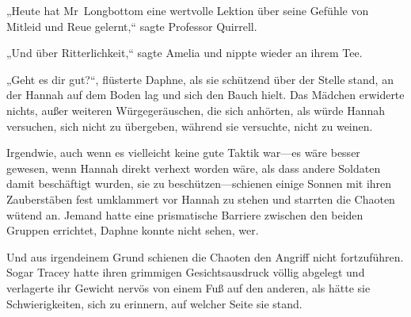 \later

„Heute hat Mr~Longbottom eine wertvolle Lektion über seine Gefühle von Mitleid und Reue gelernt,“ sagte Professor Quirrell.

„Und über Ritterlichkeit,“ sagte Amelia und nippte wieder an ihrem Tee.

\later

„Geht es dir gut?“, flüsterte Daphne, als sie schützend über der Stelle stand, an der Hannah auf dem Boden lag und sich den Bauch hielt. Das Mädchen erwiderte nichts, außer weiteren Würgegeräuschen, die sich anhörten, als würde Hannah versuchen, sich nicht zu übergeben, während sie versuchte, nicht zu weinen.

Irgendwie, auch wenn es vielleicht keine gute Taktik war—es wäre besser gewesen, wenn Hannah direkt verhext worden wäre, als dass andere Soldaten damit beschäftigt wurden, sie zu beschützen—schienen einige Sonnen mit ihren Zauberstäben fest umklammert vor Hannah zu stehen und starrten die Chaoten wütend an. Jemand hatte eine prismatische Barriere zwischen den beiden Gruppen errichtet, Daphne konnte nicht sehen, wer.

Und aus irgendeinem Grund schienen die Chaoten den Angriff nicht fortzuführen. Sogar Tracey hatte ihren grimmigen Gesichtsausdruck völlig abgelegt und verlagerte ihr Gewicht nervös von einem Fuß auf den anderen, als hätte sie Schwierigkeiten, sich zu erinnern, auf welcher Seite sie stand.

